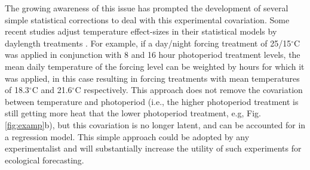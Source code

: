 \documentclass[11pt]{article}
\begin{document}
The growing awareness of this issue has prompted the development of several simple statistical corrections to deal with this experimental covariation. Some recent studies adjust temperature effect-sizes in their statistical models by daylength treatments \citep[e.g.,][]{Ettinger:2020aa}. For example, if a day/night forcing treatment of 25/15$^{\circ}$C was applied in conjunction with 8 and 16 hour photoperiod treatment levels, the mean daily temperature of the forcing level can be weighted by hours for which it was applied, in this case resulting in forcing treatments with mean temperatures of 18.3$^{\circ}$C and 21.6$^{\circ}$C respectively. This approach does not remove the covariation between temperature and photoperiod (i.e., the higher photoperiod treatment is still getting more heat that the lower photoperiod treatment, e.g, Fig. \ref{fig:examp}b), but this covariation is no longer latent, and can be accounted for in a regression model. This simple approach could be adopted by any experimentalist and will substantially increase the utility of such experiments for ecological forecasting.
\end{document}
